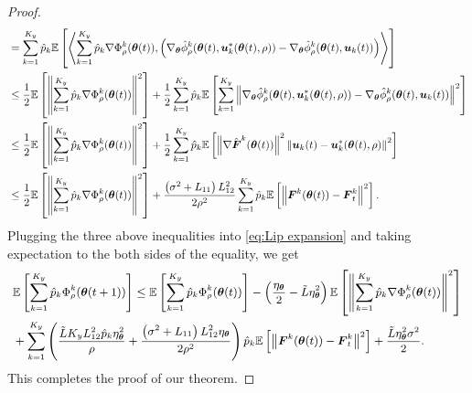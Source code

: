 \begin{proof}
\begin{equation}
\begin{aligned}
			& = \sum\limits_{k=1}^{K_{y}}\hat{p}_{k}\mathbb{E}\left[\left\langle\sum\limits_{k=1}^{K_{y}}\hat{p}_{k}\nabla\Phi_{\rho}^{k}(\text{\boldmath{$\theta$}}(t)), \left(\nabla_{\text{\boldmath{$\theta$}}}\hat{\phi}_{\rho}^{k}(\text{\boldmath{$\theta$}}(t), \boldsymbol{u}_{k}^{*}(\text{\boldmath{$\theta$}}(t), \rho)) - \nabla_{\text{\boldmath{$\theta$}}}\hat{\phi}_{\rho}^{k}(\text{\boldmath{$\theta$}}(t), \boldsymbol{u}_{k}(t))\right)\right\rangle\right] \\
			& \leq \frac{1}{2}\mathbb{E}\left[\left\|\sum\limits_{k=1}^{K_{y}}\hat{p}_{k}\nabla\Phi_{\rho}^{k}(\text{\boldmath{$\theta$}}(t))\right\|^{2}\right] + \frac{1}{2}\sum\limits_{k=1}^{K_{y}}\hat{p}_{k}\mathbb{E}\left[\sum\limits_{k=1}^{K_{y}}\left\|\nabla_{\text{\boldmath{$\theta$}}}\hat{\phi}_{\rho}^{k}(\text{\boldmath{$\theta$}}(t), \boldsymbol{u}_{k}^{*}(\text{\boldmath{$\theta$}}(t), \rho)) - \nabla_{\text{\boldmath{$\theta$}}}\hat{\phi}_{\rho}^{k}(\text{\boldmath{$\theta$}}(t), \boldsymbol{u}_{k}(t))\right\|^{2}\right] \\
			& \leq \frac{1}{2}\mathbb{E}\left[\left\|\sum\limits_{k=1}^{K_{y}}\hat{p}_{k}\nabla\Phi_{\rho}^{k}(\text{\boldmath{$\theta$}}(t))\right\|^{2}\right] + \frac{1}{2}\sum\limits_{k=1}^{K_{y}}\hat{p}_{k}\mathbb{E}\left[\left\|\nabla\hat{\boldsymbol{F}}^{k}(\text{\boldmath{$\theta$}}(t))\right\|^{2}\left\|\boldsymbol{u}_{k}(t) - \boldsymbol{u}_{k}^{*}(\text{\boldmath{$\theta$}}(t), \rho)\right\|^{2}\right] \\
			& \leq \frac{1}{2}\mathbb{E}\left[\left\|\sum\limits_{k=1}^{K_{y}}\hat{p}_{k}\nabla\Phi_{\rho}^{k}(\text{\boldmath{$\theta$}}(t))\right\|^{2}\right] + \frac{\left(\sigma^{2} + L_{11}\right)L_{12}^{2}}{2\rho^{2}}\sum\limits_{k=1}^{K_{y}}\hat{p}_{k}\mathbb{E}\left[\left\|\boldsymbol{F}^{k}(\text{\boldmath{$\theta$}}(t)) - \boldsymbol{F}_{t}^{k}\right\|^{2}\right].  
		\end{aligned}
	\end{equation}
	Plugging the three above inequalities into \eqref{eq:Lip expansion} and taking expectation to the both sides of the equality, we get 
	\begin{equation}
		\small
		\begin{aligned}
			& \mE\left[\sum\limits_{k=1}^{K_{y}}\hat{p}_{k}\Phi_{\rho}^{k}(\btheta(t + 1))\right]  \leq \mE\left[\sum\limits_{k=1}^{K_{y}}\hat{p}_{k}\Phi_{\rho}^{k}(\btheta(t))\right] - \left(\frac{\eta_{\btheta}}{2} - \tilde{L}\eta_{\btheta}^{2}\right)\mE\left[\left\|\sum\limits_{k=1}^{K_{y}}\hat{p}_{k}\nabla\Phi_{\rho}^{k}(\btheta(t))\right\|^{2}\right] \\
			& + \sum\limits_{k=1}^{K_{y}}\left(\frac{\tilde{L}K_{y}L_{12}^{2}\hat{p}_{k}\eta_{\btheta}^{2}}{\rho} + \frac{\left(\sigma^{2} + L_{11}\right)L_{12}^{2}\eta_{\btheta}}{2\rho^{2}}\right)\hat{p}_{k}\mE\left[\left\|\bF^{k}(\btheta(t)) - \bF_{t}^{k}\right\|^{2}\right] + \frac{\tilde{L}\eta_{\btheta}^{2}\sigma^{2}}{2}. 
		\end{aligned}
	\end{equation}
	This completes the proof of our theorem. 
\end{proof}
